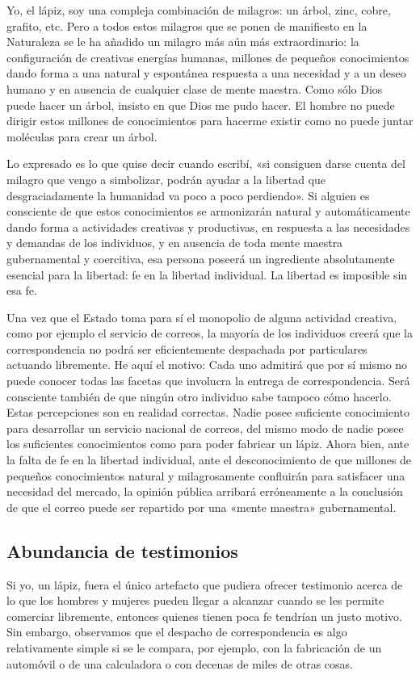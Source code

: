 \documentclass[12pt,a4paper,twoside]{book}
\begin{document}
Yo, el lápiz, soy una compleja combinación de milagros: un árbol, zinc, cobre, grafito, etc. Pero a todos estos milagros que se ponen de manifiesto en la Naturaleza se le ha añadido un milagro más aún más extraordinario: la configuración de creativas energías humanas, millones de pequeños conocimientos dando forma a una natural y espontánea respuesta a una necesidad y a un deseo humano y en ausencia de cualquier clase de mente maestra. Como sólo Dios puede hacer un árbol, insisto en que Dios me pudo hacer. El hombre no puede dirigir estos millones de conocimientos para hacerme existir como no puede juntar moléculas para crear un árbol.

Lo expresado es lo que quise decir cuando escribí, «si consiguen darse cuenta del milagro que vengo a simbolizar, podrán ayudar a la libertad que desgraciadamente la humanidad va poco a poco perdiendo». Si alguien es consciente de que estos conocimientos se armonizarán natural y automáticamente dando forma a actividades creativas y productivas, en respuesta a las necesidades y demandas de los individuos, y en ausencia de toda mente maestra gubernamental y coercitiva, esa persona poseerá un ingrediente absolutamente esencial para la libertad: fe en la libertad individual. La libertad es imposible sin esa fe.

Una vez que el Estado toma para sí el monopolio de alguna actividad creativa, como por ejemplo el servicio de correos, la mayoría de los individuos creerá que la correspondencia no podrá ser eficientemente despachada por particulares actuando libremente. He aquí el motivo: Cada uno admitirá que por sí mismo no puede conocer todas las facetas que involucra la entrega de correspondencia. Será consciente también de que ningún otro individuo sabe tampoco cómo hacerlo. Estas percepciones son en realidad correctas. Nadie posee suficiente conocimiento para desarrollar un servicio nacional de correos, del mismo modo de nadie posee los suficientes conocimientos como para poder fabricar un lápiz. Ahora bien, ante la falta de fe en la libertad individual, ante el desconocimiento de que millones de pequeños conocimientos natural y milagrosamente confluirán para satisfacer una necesidad del mercado, la opinión pública arribará erróneamente a la conclusión de que el correo puede ser repartido por una «mente maestra» gubernamental.

\subsection{Abundancia de testimonios}
Si yo, un lápiz, fuera el único artefacto que pudiera ofrecer testimonio acerca de lo que los hombres y mujeres pueden llegar a alcanzar cuando se les permite comerciar libremente, entonces quienes tienen poca fe tendrían un justo motivo. Sin embargo, observamos que el despacho de correspondencia es algo relativamente simple si se le compara, por ejemplo, con la fabricación de un automóvil o de una calculadora o con decenas de miles de otras cosas.
\end{document}
